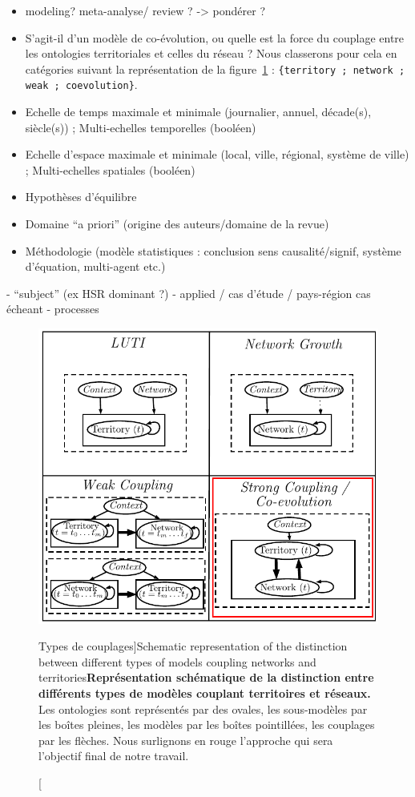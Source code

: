 \begin{itemize}
\item modeling? meta-analyse/ review ? -> pondérer ?
\item S'agit-il d'un modèle de co-évolution, ou quelle est la force du couplage entre les ontologies territoriales et celles du réseau ? Nous classerons pour cela en catégories suivant la représentation de la figure~\ref{fig:modelography:coevolution} : \texttt{\{territory ; network ; weak ; coevolution\}}.
\item Echelle de temps maximale et minimale (journalier, annuel, décade(s), siècle(s)) ; Multi-echelles temporelles (booléen)
\item Echelle d'espace maximale et minimale (local, ville, régional, système de ville) ; Multi-echelles spatiales (booléen)
\item Hypothèses d'équilibre
\item Domaine ``a priori'' (origine des auteurs/domaine de la revue)
\item Méthodologie (modèle statistiques : conclusion sens causalité/signif, système d'équation, multi-agent etc.)
\end{itemize}

- ``subject'' (ex HSR dominant ?)
- applied / cas d'étude / pays-région cas écheant
- processes


\begin{figure}
\includegraphics[width=\linewidth]{Figures/Modelography/coevolution}
\caption[Coupling types][Types de couplages]{Schematic representation of the distinction between different types of models coupling networks and territories}{\textbf{Représentation schématique de la distinction entre différents types de modèles couplant territoires et réseaux.} Les ontologies sont représentés par des ovales, les sous-modèles par les boîtes pleines, les modèles par les boîtes pointillées, les couplages par les flèches. Nous surlignons en rouge l'approche qui sera l'objectif final de notre travail.}
\label{fig:modelography:coevolution}
\end{figure}


